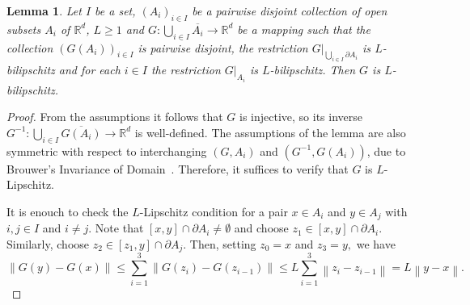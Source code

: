 \documentclass[a4paper, bibliography=totoc]{scrartcl}
\newtheorem{lemma}[define]{Lemma}
\numberwithin{claimcounter}{define}
\newcommand{\R}{\mathbb{R}}
\newcommand{\enorm}[1]{\left\|#1\right\|}
\newcommand{\cl}[1]{\overline{#1}}
\begin{document}
\begin{lemma}\label{lemma:gluing}
	Let $I$ be a set, $(A_{i})_{i\in I}$ be a pairwise disjoint collection of open subsets $A_{i}$ of $\R^{d}$, $L\geq 1$ and $G\colon \bigcup_{i\in I}\cl{A_{i}}\to \R^{d}$ be a mapping such that the collection $(G(A_{i}))_{i\in I}$ is pairwise disjoint, the restriction $G|_{\bigcup_{i\in I} \partial A_{i}}$ is $L$-bilipschitz and for each $i\in I$ the restriction $G|_{A_{i}}$ is $L$-bilipschitz. Then $G$ is $L$-bilipschitz.
\end{lemma}
\begin{proof}
	From the assumptions it follows that $G$ is injective, so its inverse $G^{-1}\colon \bigcup_{i\in I}\cl{G(A_{i})}\to \R^{d}$ is well-defined. The assumptions of the lemma are also symmetric with respect to interchanging $(G,A_{i})$ and $(G^{-1},G(A_{i}))$, due to Brouwer's Invariance of Domain~\cite[Thm. 2B.3]{Hatcher02}. Therefore, it suffices to verify that $G$ is $L$-Lipschitz.
	
	It is enouch to check the $L$-Lipschitz condition for a pair $x\in A_{i}$ and $y\in A_{j}$ with $i,j\in I$ and $i\neq j$. Note that $[x,y]\cap \partial A_{i}\neq \emptyset$ and choose $z_{1}\in [x,y]\cap \partial A_{i}$. Similarly, choose $z_{2}\in [z_{1},y]\cap \partial A_{j}$. Then, setting $z_{0}=x$ and $z_{3}=y,$ we have
	\begin{equation*}
	\enorm{G(y)-G(x)}\leq \sum_{i=1}^{3}\enorm{G(z_{i})-G(z_{i-1})}\leq L\sum_{i=1}^{3}\enorm{z_{i}-z_{i-1}}= L\enorm{y-x}.
	\end{equation*} 
\end{proof}
\end{document}

